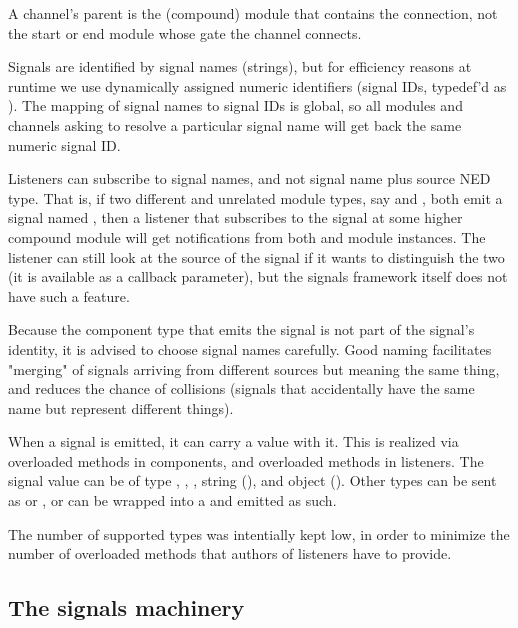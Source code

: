 \begin{note}
    A channel's parent is the (compound) module that contains the connection,
    not the start or end module whose gate the channel connects.
\begin{note}

Signals are identified by signal names (strings), but for efficiency reasons
at runtime we use dynamically assigned numeric identifiers (signal IDs,
typedef'd as ). The mapping of signal names to signal IDs is
global, so all modules and channels asking to resolve a particular signal name
will get back the same numeric signal ID.

Listeners can subscribe to signal names, and not signal name plus source NED type.
That is, if two different and unrelated module types, say  and
, both emit a signal named , then a listener that
subscribes to the  signal at some higher compound module will
get notifications from both  and  module instances.
The listener can still look at the source of the signal if it wants to
distinguish the two (it is available as a callback parameter), but the signals
framework itself does not have such a feature.

\begin{note}
  Because the component type that emits the signal is not part of the signal's
  identity, it is advised to choose signal names carefully. Good naming
  facilitates "merging" of signals arriving from different sources but
  meaning the same thing, and reduces the chance of collisions (signals that
  accidentally have the same name but represent different things).
\end{note}

When a signal is emitted, it can carry a value with it. This is realized via
overloaded  methods in components, and overloaded 
methods in listeners. The signal value can be of type , ,
, string (), and object ().
Other types can be sent as  or , or can be wrapped into
a  and emitted as such.

\begin{note}
  The number of supported types was intentially kept low, in order to minimize
  the number of overloaded methods that authors of listeners have to provide.
\end{note}


\subsection{The signals machinery}
\label{sec:simple-modules:signals-api}


\end{note}
\end{note}
